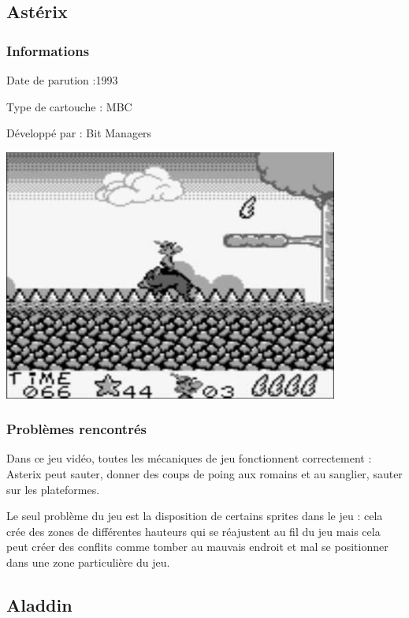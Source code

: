 \documentclass[12pt, a4paper]{article}
\begin{document}
\pagebreak
\subsection{Astérix}

\subsubsection{Informations}
Date de parution :1993

Type de cartouche : MBC

Développé par : Bit Managers

\bigskip
\begin{center}
\includegraphics[width=11cm]{asterix.jpg}
\end{center}

\bigskip
\subsubsection{Problèmes rencontrés}

Dans ce jeu vidéo, toutes les mécaniques de jeu fonctionnent correctement : Asterix peut sauter, donner des coups de poing aux romains et au sanglier, sauter sur les plateformes.

Le seul problème du jeu est la disposition de certains sprites dans le jeu : cela crée des zones de différentes hauteurs qui se réajustent au fil du jeu mais cela peut créer des conflits comme tomber au mauvais endroit et mal se positionner dans une zone particulière du jeu.

\pagebreak
\subsection{Aladdin}
\end{document}
